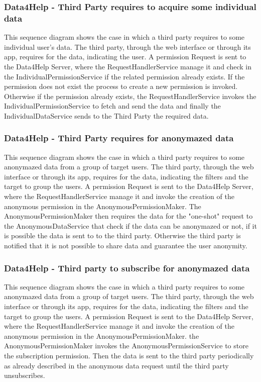 \documentclass[a4paper]{article}
\begin{document}
\subsubsection{Data4Help - Third Party requires to acquire some individual data}
This sequence diagram shows the case in which a third party requires to some individual user's data.
The third party, through the web interface or through its app, requires for the data, indicating the user. A permission Request is sent to the Data4Help Server, where the RequestHandlerService manage it and check in the IndividualPermissionService if the related permission already exists.
If the permission does not exist the process to create a new permission is invoked.
Otherwise if the permission already exists, the RequestHandlerService invokes the IndividualPermissionService to fetch and send the data and finally the IndividualDataService sends to the Third Party the required data.

\subsubsection{Data4Help - Third Party requires for anonymazed data}
This sequence diagram shows the case in which a third party requires to some anonymazed data from a group of target users.
The third party, through the web interface or through its app, requires for the data, indicating the filters and the target to group the users.
A permission Request is sent to the Data4Help Server, where the RequestHandlerService manage it and invoke the creation of the anonymous permission in the AnonymousPermissionMaker.
The AnonymousPermissionMaker then requires the data for the "one-shot" request to the AnonymousDataService that check if the data can be anonymazed or not, if it is possible the data is sent to to the third party. Otherwise the third party is notified that it is not possible to share data and guarantee the user anonymity.

\subsubsection{Data4Help - Third party to subscribe for anonymazed data}
This sequence diagram shows the case in which a third party requires to some anonymazed data from a group of target users.
The third party, through the web interface or through its app, requires for the data, indicating the filters and the target to group the users.
A permission Request is sent to the Data4Help Server, where the RequestHandlerService manage it and invoke the creation of the anonymous permission in the AnonymousPermissionMaker.
the AnonymousPermissionMaker invokes the AnonymousPermissionService to store the subscription permission.
Then the data is sent to the third party periodically as already described in the anonymous data request until the third party unsubscribes. 
\end{document}
